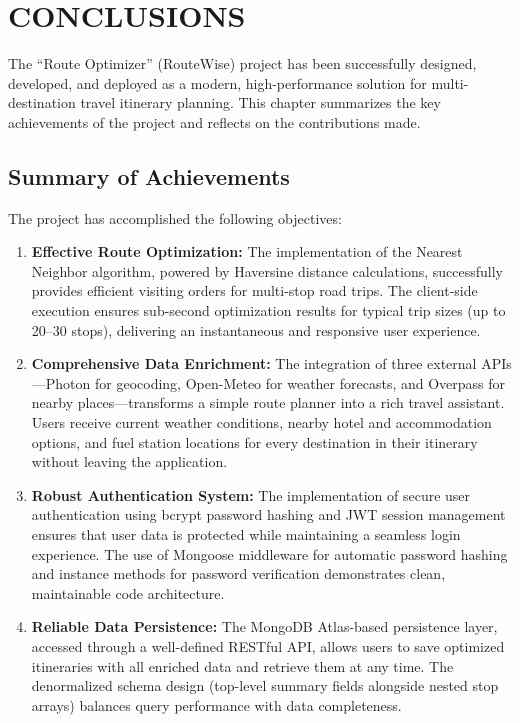 \chapter{CONCLUSIONS}
The ``Route Optimizer'' (RouteWise) project has been successfully designed, developed, and deployed as a modern, high-performance solution for multi-destination travel itinerary planning. This chapter summarizes the key achievements of the project and reflects on the contributions made.

\section{Summary of Achievements}
The project has accomplished the following objectives:
\begin{enumerate}
    \item \textbf{Effective Route Optimization:} The implementation of the Nearest Neighbor algorithm, powered by Haversine distance calculations, successfully provides efficient visiting orders for multi-stop road trips. The client-side execution ensures sub-second optimization results for typical trip sizes (up to 20--30 stops), delivering an instantaneous and responsive user experience.

    \item \textbf{Comprehensive Data Enrichment:} The integration of three external APIs---Photon for geocoding, Open-Meteo for weather forecasts, and Overpass for nearby places---transforms a simple route planner into a rich travel assistant. Users receive current weather conditions, nearby hotel and accommodation options, and fuel station locations for every destination in their itinerary without leaving the application.

    \item \textbf{Robust Authentication System:} The implementation of secure user authentication using bcrypt password hashing and JWT session management ensures that user data is protected while maintaining a seamless login experience. The use of Mongoose middleware for automatic password hashing and instance methods for password verification demonstrates clean, maintainable code architecture.

    \item \textbf{Reliable Data Persistence:} The MongoDB Atlas-based persistence layer, accessed through a well-defined RESTful API, allows users to save optimized itineraries with all enriched data and retrieve them at any time. The denormalized schema design (top-level summary fields alongside nested stop arrays) balances query performance with data completeness.


\end{enumerate}
